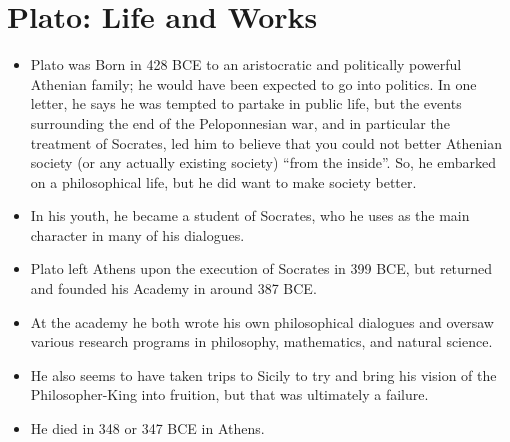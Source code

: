 \documentclass[oneside]{article}
\begin{document}
\thispagestyle{fancy}

\section*{Plato: Life and Works}
\begin{itemize}
\item{Plato was Born in 428 BCE to an aristocratic and politically powerful Athenian family; he would have been expected to go into politics. In one letter, he says he was tempted to partake in public life, but the events surrounding the end of the Peloponnesian war, and in particular the treatment of Socrates, led him to believe that you could not better Athenian society (or any actually existing society) ``from the inside''. So, he embarked on a philosophical life, but he did want to make society better.}\item{In his youth, he became a student of Socrates, who he uses as the main character in many of his dialogues.}
\item{Plato left Athens upon the execution of Socrates in 399 BCE, but returned and founded his Academy in around 387 BCE.}
\item{At the academy he both wrote his own philosophical dialogues and oversaw various research programs in philosophy, mathematics, and natural science.}
\item{He also seems to have taken trips to Sicily to try and bring his vision of the Philosopher-King into fruition, but that was ultimately a failure.}
\item{He died in 348 or 347 BCE in Athens.}
\end{itemize}
\end{document}
